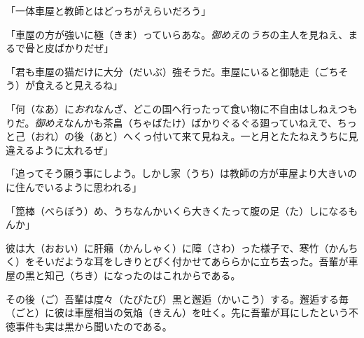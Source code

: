 \documentclass{book}
\begin{document}
「一体車屋と教師とはどっちがえらいだろう」

「車屋の方が強いに極（きま）っていらあな。\emph{御めえ}の\emph{うち}の主人を見ねえ、まるで骨と皮ばかりだぜ」

「君も車屋の猫だけに大分（だいぶ）強そうだ。車屋にいると御馳走（ごちそう）が食えると見えるね」

「何（なあ）に\emph{おれ}なんざ、どこの国へ行ったって食い物に不自由はしねえつもりだ。\emph{御めえ}なんかも茶畠（ちゃばたけ）ばかりぐるぐる廻っていねえで、ちっと己（おれ）の後（あと）へくっ付いて来て見ねえ。一と月とたたねえうちに見違えるように太れるぜ」

「追ってそう願う事にしよう。しかし家（うち）は教師の方が車屋より大きいのに住んでいるように思われる」

「箆棒（べらぼう）め、うちなんかいくら大きくたって腹の足（た）しになるもんか」

彼は大（おおい）に肝癪（かんしゃく）に障（さわ）った様子で、寒竹（かんちく）をそいだような耳をしきりとぴく付かせてあららかに立ち去った。吾輩が車屋の黒と知己（ちき）になったのはこれからである。

その後（ご）吾輩は度々（たびたび）黒と邂逅（かいこう）する。邂逅する毎（ごと）に彼は車屋相当の気焔（きえん）を吐く。先に吾輩が耳にしたという不徳事件も実は黒から聞いたのである。
\end{document}
